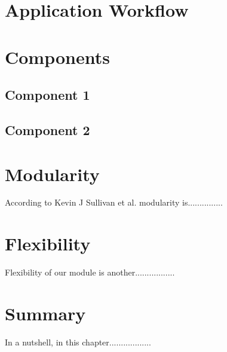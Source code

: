 \section{Application Workflow}


\section{Components}


\subsection{Component 1}


\subsection{Component 2}


\section{Modularity}
According to Kevin J Sullivan et al. modularity is...............

\section{Flexibility}
Flexibility of our module is another.................

\section{Summary}
In a nutshell, in this chapter..................